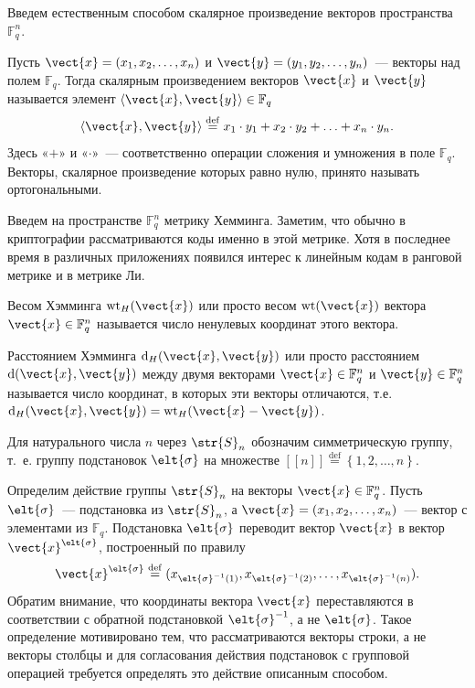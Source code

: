 \documentclass[14pt]{cmcmsuthesis-bachelor}
\begin{document}
Введем естественным способом скалярное произведение векторов пространства \(\mathbb{F}^n_q\).

Пусть \(\vect{x}=(x_1,x_2,\ldots, x_n)\) и \(\vect{y}=(y_1,y_2,\ldots,y_n)\)~--- векторы над полем \(\mathbb{F}_q\).
Тогда скалярным произведением векторов \(\vect{x}\) и \(\vect{y}\) называется элемент \(\left\langle \vect{x}, \vect{y} \right\rangle\in \mathbb{F}_q\)
\[
\left\langle\vect{x}, \vect{y}\right\rangle
\stackrel{\mathrm{def}}{=} x_1\cdot y_1 + x_2\cdot y_2 + \ldots + x_n\cdot y_n.
\]
Здесь «\(+\)» и «\(\cdot\)»~--- соответственно операции сложения и умножения в поле \(\mathbb{F}_q\).
Векторы, скалярное произведение которых равно нулю, принято называть ортогональными.

Введем на пространстве \(\mathbb{F}^n_q\) метрику Хемминга.
Заметим, что обычно в криптографии рассматриваются коды именно в этой метрике.
Хотя в последнее время в различных приложениях появился интерес к линейным кодам в ранговой метрике и в метрике Ли.

Весом Хэмминга \(\operatorname{wt}_H(\vect{x})\) или просто весом \(\operatorname{wt}(\vect{x})\) вектора \(\vect{x}\in \mathbb{F}^n_q\) называется число ненулевых координат этого вектора.

Расстоянием Хэмминга \(\operatorname{d}_H(\vect{x},\vect{y})\) или просто расстоянием \(\operatorname{d}(\vect{x},\vect{y})\) между двумя векторами \(\vect{x}\in \mathbb{F}^n_q\) и \(\vect{y}\in \mathbb{F}^n_q\) называется число координат, в которых эти векторы отличаются, т.е. \(\operatorname{d}_H(\vect{x},\vect{y})=\operatorname{wt}_H(\vect{x}-\vect{y})\).

Для натурального числа \(n\) через \(\str{S}_{n}\) обозначим симметрическую группу, т.~е. группу подстановок \(\elt{\sigma}\) на множестве \([\![n]\!] \stackrel{\mathrm{def}}{=} \left\{1,2, \dotsc, n\right\}\).

Определим действие группы \(\str{S}_{n}\) на векторы \(\vect{x}\in \mathbb{F}^{n}_{q}\).
Пусть \(\elt{\sigma}\)~--- подстановка из \(\str{S}_{n}\), а \(\vect{x}=(x_1,x_2,\ldots,x_n)\)~--- вектор с элементами из \(\mathbb{F}_q\).
Подстановка \(\elt{\sigma}\) переводит вектор \(\vect{x}\) в вектор \(\vect{x}^{\elt{\sigma}}\), построенный по правилу
\[\vect{x}^{\elt{\sigma}}\stackrel{\mathrm{def}}{=}(x_{\elt{\sigma}^{-1}(1)},x_{\elt{\sigma}^{-1}(2)},\ldots,x_{\elt{\sigma}^{-1}(n)}).\]
Обратим внимание, что координаты вектора \(\vect{x}\) переставляются в соответствии с обратной подстановкой \(\elt{\sigma}^{-1}\), а не \(\elt{\sigma}\).
Такое определение мотивировано тем, что рассматриваются векторы строки, а не векторы столбцы и для согласования действия подстановок с групповой операцией требуется определять это действие описанным способом.
\end{document}
